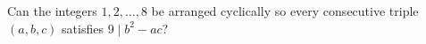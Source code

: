 Can the integers $1,2,\ldots,8$ be arranged cyclically so every consecutive triple $(a,b,c)$ satisfies $9\mid b^2-ac$?
